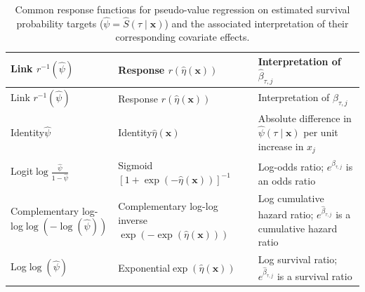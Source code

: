 \documentclass[
  letterpaper,
  krantz2]{style/krantz}
\begin{document}
\begin{longtable}[]{@{}
  >{\raggedright\arraybackslash}p{}
  >{\raggedright\arraybackslash}p{}
  >{\raggedright\arraybackslash}p{}@{}}
\caption{Common response functions for pseudo-value regression on
estimated survival probability targets
(\(\hat{\psi} = \hat{S}(\tau \mid \mathbf{x})\)) and the associated
interpretation of their corresponding covariate
effects.}\label{tbl-pseudo-link-interpretation}\tabularnewline
\toprule\noalign{}
\begin{minipage}[b]{\linewidth}\raggedright
Link \(r^{-1}(\hat{\psi})\)
\end{minipage} & \begin{minipage}[b]{\linewidth}\raggedright
Response \(r(\hat\eta(\mathbf{x}))\)
\end{minipage} & \begin{minipage}[b]{\linewidth}\raggedright
Interpretation of \(\hat{\beta}_{\tau,j}\)
\end{minipage} \\
\midrule\noalign{}
\endfirsthead
\toprule\noalign{}
\begin{minipage}[b]{\linewidth}\raggedright
Link \(r^{-1}(\hat{\psi})\)
\end{minipage} & \begin{minipage}[b]{\linewidth}\raggedright
Response \(r(\hat\eta(\mathbf{x}))\)
\end{minipage} & \begin{minipage}[b]{\linewidth}\raggedright
Interpretation of \(\hat{\beta}_{\tau,j}\)
\end{minipage} \\
\midrule\noalign{}
\endhead
\bottomrule\noalign{}
\endlastfoot
Identity\(\hat{\psi}\) & Identity\(\hat\eta(\mathbf{x})\) & Absolute
difference in \(\hat{\psi}(\tau\mid\mathbf{x})\) per unit increase in
\(x_j\) \\
Logit\(\log\frac{\hat{\psi}}{1-\hat{\psi}}\) &
Sigmoid\(\left[1+\exp(-\hat\eta(\mathbf{x}))\right]^{-1}\) & Log-odds
ratio; \(e^{\hat{\beta}_{\tau,j}}\) is an odds ratio \\
Complementary log-log\(\log(-\log(\hat{\psi}))\) & Complementary log-log
inverse\(\exp(-\exp(\hat\eta(\mathbf{x})))\) & Log cumulative hazard
ratio; \(e^{\hat{\beta}_{\tau,j}}\) is a cumulative hazard ratio \\
Log\(\log(\hat{\psi})\) & Exponential\(\exp(\hat\eta(\mathbf{x}))\) &
Log survival ratio; \(e^{\hat{\beta}_{\tau,j}}\) is a survival ratio \\
\end{longtable}
\end{document}
